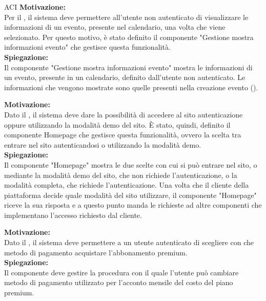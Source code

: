 \begin{listaPersonale}{ACI}
    \textbf{Motivazione:}\\
    Per il , il sistema deve permettere all'utente non autenticato di visualizzare le informazioni di un evento, presente nel calendario, una volta che viene selezionato. Per questo motivo, è stato definito il componente "Gestione mostra informazioni evento" che gestisce questa funzionalità.\\
    \textbf{Spiegazione:}\\
    Il componente "Gestione mostra informazioni evento" mostra le informazioni di un evento, presente in un calendario, definito dall'utente non autenticato. Le informazioni che vengono mostrate sono quelle presenti nella creazione evento ().


    \textbf{Motivazione:}\\
    Dato il , il sistema deve dare la possibilità di accedere al sito autenticazione oppure utilizzando la modalità demo del sito. È stato, quindi, definito il componente Homepage che gestisce questa funzionalità, ovvero la scelta tra entrare nel sito autenticandosi o utilizzando la modalità demo.\\
    \textbf{Spiegazione:}\\
    Il componente "Homepage" mostra le due scelte con cui si può entrare nel sito, o mediante la modalità demo del sito, che non richiede l'autenticazione, o la modalità completa, che richiede l'autenticazione. Una volta che il cliente della piattaforma decide quale modalità del sito utilizzare, il componente "Homepage" riceve la sua risposta e a questo punto manda le richieste ad altre componenti che implementano l'accesso richiesto dal cliente.


    \textbf{Motivazione:}\\
    Dato il , il sistema deve permettere a un utente autenticato di scegliere con che metodo di pagamento acquistare l'abbonamento premium.\\
    \textbf{Spiegazione:}\\
    Il componente deve gestire la procedura con il quale l'utente può cambiare metodo di pagamento utilizzato per l'acconto mensile del costo del piano premium.



\end{listaPersonale}
